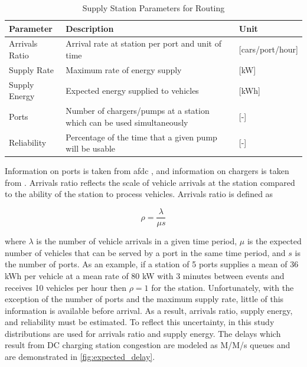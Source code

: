 \documentclass[11pt]{article}
\begin{document}
\begin{multicols}{2}
\begin{table}[H]
	\centering
	\caption{Supply Station Parameters for Routing}
	\label{tab:param_supply}
	\begin{tabular}{|C{/8}|C{/8}|C{/8}|}
		\hline Parameter & Description & Unit \\
		\hline Arrivals Ratio & Arrival rate at station per port and unit of time & [cars/port/hour] \\
		\hline Supply Rate & Maximum rate of energy supply & [kW] \\
		\hline Supply Energy & Expected energy supplied to vehicles & [kWh] \\
		\hline Ports & Number of chargers/pumps at a station which can be used simultaneously & [-] \\
		\hline Reliability & Percentage of the time that a given pump will be usable & [-] \\ 
		\hline
	\end{tabular}
\end{table}

Information on ports is taken from \gls{afdc} \cite{afdc_2023}, and information on chargers is taken from \cite{Rempel_2023}. Arrivals ratio reflects the scale of vehicle arrivals at the station compared to the ability of the station to process vehicles. Arrivals ratio is defined as

\begin{equation}
	\rho = \frac{\lambda}{\mu s}\label{eq:rho}
\end{equation}

where $\lambda$ is the number of vehicle arrivals in a given time period, $\mu$ is the expected number of vehicles that can be served by a port in the same time period, and $s$ is the number of ports. As an example, if a station of 5 ports supplies a mean of 36 kWh per vehicle at a mean rate of 80 kW with 3 minutes between events and receives 10 vehicles per hour then $\rho = 1$ for the station. Unfortunately, with the exception of the number of ports and the maximum supply rate, little of this information is available before arrival. As a result, arrivals ratio, supply energy, and reliability must be estimated. To reflect this uncertainty, in this study distributions are used for arrivals ratio and supply energy. The delays which result from DC charging station congestion are modeled as M/M/s queues and are demonstrated in \ref{fig:expected_delay}.

\end{multicols}
\end{document}

